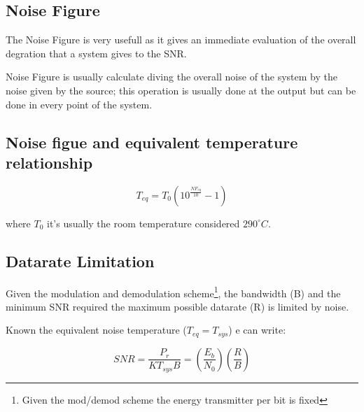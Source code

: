 \subsection{Noise Figure} %
\label{sub:noise_figure}

The Noise Figure is very usefull as it gives an immediate evaluation of the overall degration that a system gives to the SNR.

Noise Figure is usually  calculate diving the overall noise of the system by the noise given by the source; this operation is usually done at the output but can be done in every point of the system.


\subsection{Noise figue and equivalent temperature relationship} %
\label{sub:noise_figue_and_equivalent_temperature_relationship}


\begin{equation}
	T_{eq}= T_0(10^{\frac{NF_{eq}}{10}}-1)
\end{equation}

where $T_0$ it's usually the room temperature considered $290^{\circ}C$.


\subsection{Datarate Limitation} %
\label{sub:datarate_limitation}


Given the modulation and demodulation scheme\footnote{Given the mod/demod scheme the energy transmitter per bit is fixed}, the bandwidth (B) and the minimum SNR required the maximum possible datarate (R) is limited by noise.

Known the equivalent noise temperature ($T_{eq}=T_{sys}$) e can write:

\begin{equation}	
SNR = \frac{P_r}{KT_{sys}B}=\left(\frac{E_b}{N_0}\right)\left(\frac{R}{B}\right)
\end{equation}









